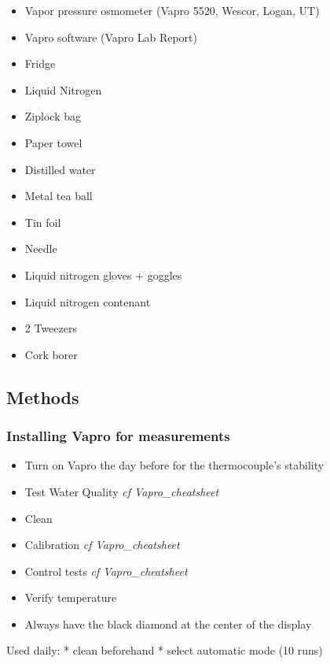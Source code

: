 \documentclass[
  12pt,
  american,
  a4paper,
  extrafontsizes,onecolumn,openright
  ]{memoir}
\providecommand{\tightlist}{%
  \setlength{\itemsep}{0pt}\setlength{\parskip}{0pt}}
\begin{document}
\begin{itemize}
\tightlist
\item
  Vapor pressure osmometer (Vapro 5520, Wescor, Logan, UT)
\item
  Vapro software (Vapro Lab Report)
\item
  Fridge
\item
  Liquid Nitrogen
\item
  Ziplock bag\\
\item
  Paper towel
\item
  Distilled water
\item
  Metal tea ball
\item
  Tin foil
\item
  Needle\\
\item
  Liquid nitrogen gloves + goggles
\item
  Liquid nitrogen contenant
\item
  2 Tweezers
\item
  Cork borer
\end{itemize}

\hypertarget{methods}{%
\subsection{Methods}\label{methods}}

\hypertarget{installing-vapro-for-measurements}{%
\subsubsection{Installing Vapro for measurements}\label{installing-vapro-for-measurements}}

\begin{itemize}
\tightlist
\item
  Turn on Vapro the day before for the thermocouple's stability
\item
  Test Water Quality \emph{cf Vapro\_cheatsheet}
\item
  Clean
\item
  Calibration \emph{cf Vapro\_cheatsheet}
\item
  Control tests \emph{cf Vapro\_cheatsheet}
\item
  Verify temperature
\item
  Always have the black diamond at the center of the display
\end{itemize}

Used daily:
* clean beforehand
* select automatic mode (10 runs)
\end{document}
